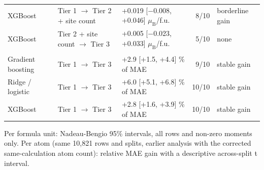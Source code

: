 \begin{table}
\begin{tabularx}{\textwidth}{@{}>{\raggedright\arraybackslash}Xllrl@{}}
\quad XGBoost & Tier 1 $\rightarrow$ Tier 2 + site count & +0.019 [$-$0.008, +0.046] $\mu_\mathrm{B}$/f.u. & 8/10 & borderline gain \\
\quad XGBoost & Tier 2 + site count $\rightarrow$ Tier 3 & +0.005 [$-$0.023, +0.033] $\mu_\mathrm{B}$/f.u. & 5/10 & none \\
\addlinespace
\multicolumn{5}{@{}l@{}}{\textit{per atom (moment / sites), all rows}} \\
\quad Gradient boosting & Tier 1 $\rightarrow$ Tier 3 & +2.9 [+1.5, +4.4] \% of MAE & 9/10 & stable gain \\
\quad Ridge / logistic & Tier 1 $\rightarrow$ Tier 3 & +6.0 [+5.1, +6.8] \% of MAE & 10/10 & stable gain \\
\quad XGBoost & Tier 1 $\rightarrow$ Tier 3 & +2.8 [+1.6, +3.9] \% of MAE & 10/10 & stable gain \\
\bottomrule
\end{tabularx}
\par\vspace{4pt}\raggedright\noindent Per formula unit: Nadeau-Bengio 95\% intervals, all rows and non-zero moments only. Per atom (same 10,821 rows and splits, earlier analysis with the corrected same-calculation atom count): relative MAE gain with a descriptive across-split t interval.
\end{table}
